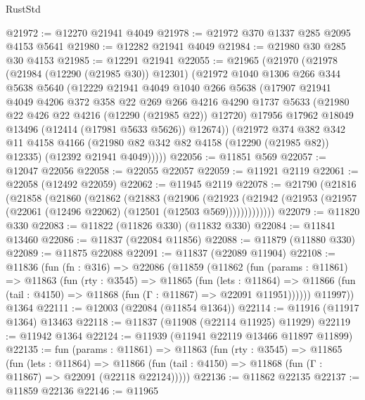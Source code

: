 \begin{lexlean}{RustStd}
\begin{coremodule}
@21972 := @12270 @21941 @4049
@21978 := @21972 @370 @1337 @285 @2095 @4153 @5641
@21980 := @12282 @21941 @4049
@21984 := @21980 @30 @285 @30 @4153
@21985 := @12291 @21941
@22055 := @21965
    (@21970
      (@21978
        (@21984 (@12290 (@21985 @30)) @12301)
        (@21972
          @1040
          @1306
          @266
          @344
          @5638
          @5640
          (@12229
            @21941
            @4049
            @1040
            @266
            @5638
            (@17907
              @21941
              @4049
              @4206
              @372
              @358
              @22
              @269
              @266
              @4216
              @4290
              @1737
              @5633
              (@21980 @22 @426 @22 @4216 (@12290 (@21985 @22)) @12720)
              @17956
              @17962
              @18049
              @13496
              (@12414 (@17981 @5633 @5626))
              @12674))
          (@21972
            @374
            @382
            @342
            @11
            @4158
            @4166
            (@21980 @82 @342 @82 @4158 (@12290 (@21985 @82)) @12335)
            (@12392 @21941 @4049)))))
@22056 := @11851 @569
@22057 := @12047 @22056
@22058 := @22055 @22057
@22059 := @11921 @2119
@22061 := @22058 (@12492 @22059)
@22062 := @11945 @2119
@22078 := @21790
    (@21816
      (@21858
        (@21860
          (@21862
            (@21883
              (@21906
                (@21923
                  (@21942 (@21953 (@21957 (@22061 (@12496 @22062) (@12501 (@12503 @569)))))))))))))
@22079 := @11820 @330
@22083 := @11822 (@11826 @330) (@11832 @330)
@22084 := @11841 @13460
@22086 := @11837 (@22084 @11856)
@22088 := @11879 (@11880 @330)
@22089 := @11875 @22088
@22091 := @11837 (@22089 @11904)
@22108 := @11836
    (fun (fn : @316) =>
    @22086
      (@11859
        (@11862
          (fun (params : @11861) =>
          @11863
            (fun (rty : @3545) =>
            @11865
              (fun (lets : @11864) =>
              @11866 (fun (tail : @4150) => @11868 (fun (Γ : @11867) => @22091 @11951))))))
        @11997))
    @1364
@22111 := @12003 (@22084 (@11854 @1364))
@22114 := @11916 (@11917 @1364) @13463
@22118 := @11837 (@11908 (@22114 @11925) @11929)
@22119 := @11942 @1364
@22124 := @11939 (@11941 @22119 @13466 @11897 @11899)
@22135 := fun (params : @11861) =>
  @11863
    (fun (rty : @3545) =>
    @11865
      (fun (lets : @11864) =>
      @11866 (fun (tail : @4150) => @11868 (fun (Γ : @11867) => @22091 (@22118 @22124)))))
@22136 := @11862 @22135
@22137 := @11859 @22136
@22146 := @11965

\end{coremodule}
\end{lexlean}
